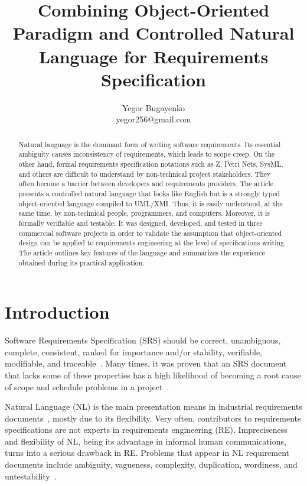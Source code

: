 \documentclass[sigplan,10pt,nonacm=true]{acmart}
\newcommand{\nospell}[1]{#1}
\begin{document}
\title{Combining Object-Oriented Paradigm and Controlled Natural Language for Requirements Specification}
\author{Yegor Bugayenko\\yegor256@gmail.com}
\begin{abstract} Natural language is the dominant form of writing software requirements.
Its essential ambiguity causes inconsistency of requirements,
which leads to scope creep. On the other hand, formal requirements
specification notations such as Z, \nospell{Petri Nets}, SysML, and others are
difficult to understand by non-technical project stakeholders. They often
become a barrier between developers and requirements providers. The article
presents a controlled natural language that looks like English but
is a strongly typed object-oriented language compiled to
UML/XMI. Thus, it is easily understood, at the same time, by non-technical
people, programmers, and computers. Moreover, it is formally verifiable and
testable. It was designed, developed, and tested in three commercial
software projects in order to validate the assumption that object-oriented
design can be applied to requirements engineering at the level of
specifications writing. The article outlines key features of the language and summarizes
the experience obtained during its practical application. \end{abstract}
\maketitle

\section{Introduction}
\label{sec:intro}

Software Requirements Specification (SRS) should be correct, unambiguous,
complete, consistent, ranked for importance and/or stability, verifiable,
modifiable, and traceable~\citep{ieee830}. Many times, it was proven that an SRS
document that lacks some of these properties has a high likelihood of
becoming a root cause of scope and schedule problems in a
project~\citep{wiegers03,ears09,chen09}.

Natural Language (NL) is the main presentation means in industrial
requirements documents~\citep{kof10,sinha10}, mostly due to its flexibility.
Very often, contributors to requirements specifications are not experts in
requirements engineering (RE). Impreciseness and flexibility of NL, being
its advantage in informal human communications, turns into a serious drawback
in RE. Problems that appear in NL requirement documents include
ambiguity, vagueness, complexity, duplication, wordiness, and
\nospell{untestability}~\citep{ears09}.
\end{document}
